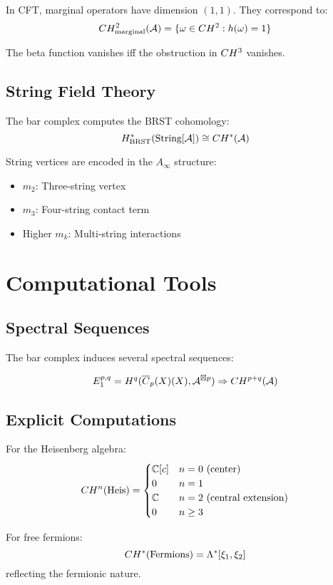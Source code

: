 In CFT, marginal operators have dimension $(1,1)$. They correspond to:
$$CH^2_{\text{marginal}}(\mathcal{A}) = \{\omega \in CH^2 : h(\omega) = 1\}$$

The beta function vanishes iff the obstruction in $CH^3$ vanishes.

\subsection{String Field Theory}

The bar complex computes the BRST cohomology:
$$H^*_{\text{BRST}}(\text{String}[\mathcal{A}]) \cong CH^*(\mathcal{A})$$

String vertices are encoded in the $A_\infty$ structure:
\begin{itemize}
\item $m_2$: Three-string vertex
\item $m_3$: Four-string contact term
\item Higher $m_k$: Multi-string interactions
\end{itemize}

\section{Computational Tools}

\subsection{Spectral Sequences}

The bar complex induces several spectral sequences:

\begin{theorem}
$$E_1^{p,q} = H^q(\overline{C}_{p}(X)(X), \mathcal{A}^{\boxtimes p}) \Rightarrow CH^{p+q}(\mathcal{A})$$
\end{theorem}

\subsection{Explicit Computations}

For the Heisenberg algebra:
$$CH^n(\text{Heis}) = \begin{cases}
\mathbb{C}[c] & n = 0 \text{ (center)} \\
0 & n = 1 \\
\mathbb{C} & n = 2 \text{ (central extension)} \\
0 & n \geq 3
\end{cases}$$

For free fermions:
$$CH^*(\text{Fermions}) = \Lambda^*[\xi_1, \xi_2]$$
reflecting the fermionic nature.